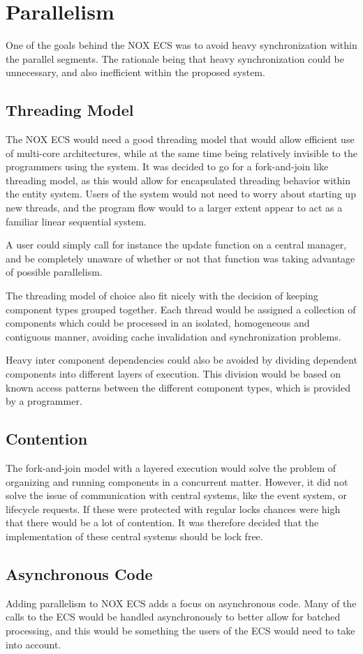 \section{Parallelism}
One of the goals behind the NOX ECS was to avoid heavy synchronization within the parallel segments.
The rationale being that heavy synchronization could be unnecessary, and also inefficient within the proposed system.

\subsection{Threading Model}
\label{subsubsec:high_level_threading_model}
The NOX ECS would need a good threading model that would allow efficient use of multi-core
architectures, while at the same time being relatively invisible to the programmers
using the system.
It was decided to go for a fork-and-join like threading model\cite[p. 369]{game_engine_architecture},
as this would allow for encapsulated threading behavior within the entity system.
Users of the system would not need to worry about starting up new threads,
and the program flow would to a larger extent appear to act as a familiar linear sequential system.

A user could simply call for instance the update function on a central manager, and be completely
unaware of whether or not that function was taking advantage of possible parallelism.

The threading model of choice also fit nicely with the decision of keeping component types
grouped together.
Each thread would be assigned a collection of components which could be processed in an isolated,
homogeneous and contiguous manner, avoiding cache invalidation and synchronization problems.

Heavy inter component dependencies could also be avoided by dividing dependent components
into different layers of execution.
This division would be based on known access patterns between the different component types,
which is provided by a programmer.

\subsection{Contention}
The fork-and-join model with a layered execution would solve the problem of organizing and running components
in a concurrent matter.
However, it did not solve the issue of communication with central systems, like the event system, or lifecycle requests.
If these were protected with regular locks chances were high that there would be a lot of contention.
It was therefore decided that the implementation of these central systems should be lock free.

\subsection{Asynchronous Code}
Adding parallelism to NOX ECS adds a focus on asynchronous code.
Many of the calls to the ECS would be handled asynchronously to better allow for batched
processing, and this would be something the users of the ECS would need to take into account.
